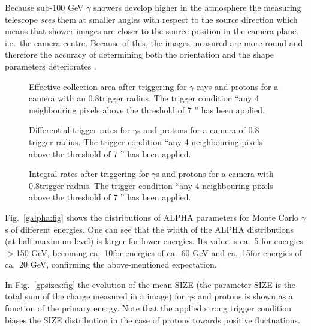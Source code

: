 Because sub-100 GeV $\gamma$ showers develop higher in the atmosphere the
measuring telescope {\it sees} them at smaller angles with respect to
the source
direction which means that shower images are closer to the source
position in the camera plane. i.e.\ the camera centre. Because of this,
the  images measured are more round and therefore the accuracy of
determining both the orientation and the shape parameters
deteriorates \cite{tanimori:94}.
\begin{figure}[h]
 \begin{center}
  \caption{Effective collection area after triggering for $\gamma$-rays
and protons for a camera with an 0.8\tdeg trigger radius. The trigger
condition ``any 4 neighbouring pixels above the threshold of 7 \phes''
has been applied.}
  \label{careaipd:fig}
 \end{center}
\end{figure}
\begin{figure}[h]
 \begin{center}
  \caption{Differential trigger rates for $\gamma$s and protons for
a camera of 0.8\tdeg
trigger radius. The trigger condition ``any 4 neighbouring
pixels above the threshold of 7 \phes'' has been applied.}
  \label{drateipd:fig}
 \end{center}
\end{figure}
\begin{figure}[h]
 \begin{center}
  \caption{Integral rates after triggering for $\gamma$s and protons
for a camera with  0.8\tdeg trigger radius. The trigger condition
``any 4 neighbouring pixels above the threshold of 7 \phes'' has been
applied.}
  \label{irateipd:fig}
 \end{center}
\end{figure}


Fig.~\ref{galpha:fig} shows the distributions of ALPHA
parameters for Monte Carlo $\gamma$s of different energies.
One can see that the width of the ALPHA distributions (at half-maximum
level) is larger for lower energies. Its value is ca.~5\tdeg
for energies $>$150 GeV, becoming ca.~10\tdeg for energies
of ca.~60 GeV and ca.~15\tdeg for energies of ca.~20 GeV, confirming
the above-mentioned expectation.

In Fig.~\ref{gpsizes:fig} the evolution
of the mean SIZE (the parameter SIZE is the total 
sum of the charge measured
in a image) for $\gamma$s and protons is shown as a function of the
primary energy. Note that the applied strong trigger condition biases the
SIZE distribution in the case of protons towards
positive fluctuations.

